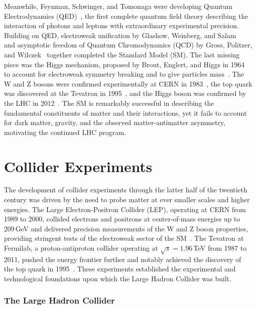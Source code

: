 Meanwhile, Feynman, Schwinger, and Tomonaga were developing Quantum Electrodynamics (QED)~\cite{Tomonaga1946,Schwinger1948,Feynman1949}, the first complete quantum field theory describing the interaction of photons and leptons with extraordinary experimental precision.
Building on QED, electroweak unification by Glashow, Weinberg, and Salam~\cite{Glashow1961,Weinberg1967,Salam1968} and asymptotic freedom of Quantum Chromodynamics (QCD) by Gross, Politzer, and Wilczek~\cite{Gross1973,Politzer1973} together completed the Standard Model (SM). 
The last missing piece was the Higgs mechanism, proposed by Brout, Englert, and Higgs in 1964 to account for electroweak symmetry breaking and to give particles mass~\cite{EnglertBrout1964,Higgs1964}. 
The W and Z bosons were confirmed experimentally at CERN in 1983~\cite{UA1W1983,UA1Z1983}, the top quark was discovered at the Tevatron in 1995~\cite{CDF1995}, and the Higgs boson was confirmed by the LHC in 2012~\cite{ATLAS-Higgs2012,CMS-Higgs2012}. 
The SM is remarkably successful in describing the fundamental constituents of matter and their interactions, yet it fails to account for dark matter, gravity, and the observed matter-antimatter asymmetry, motivating the continued LHC program.

\section{Collider Experiments}

The development of collider experiments through the latter half of the twentieth century was driven by the need to probe matter at ever smaller scales and higher energies.
The Large Electron-Positron Collider (LEP), operating at CERN from 1989 to 2000, collided electrons and positrons at center-of-mass energies up to 209\,GeV and delivered precision measurements of the W and Z boson properties, providing stringent tests of the electroweak sector of the SM~\cite{LEP2006,LEP-W2013}.
The Tevatron at Fermilab, a proton-antiproton collider operating at $\sqrt{s} = 1.96$\,TeV from 1987 to 2011, pushed the energy frontier further and notably achieved the discovery of the top quark in 1995~\cite{CDF1995}.
These experiments established the experimental and technological foundations upon which the Large Hadron Collider was built.

\subsubsection{The Large Hadron Collider}

